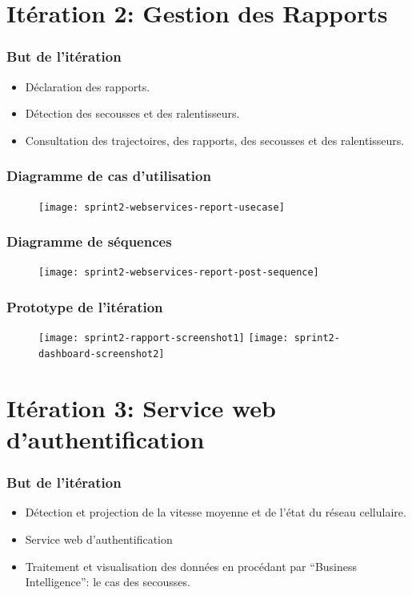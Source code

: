 \documentclass{beamer}
\begin{document}
\section{Itération 2: Gestion des Rapports}

\begin{frame}
    \frametitle{But de l'itération}
    \begin{itemize}
        \item Déclaration des rapports.
        \item Détection des secousses et des ralentisseurs.
        \item Consultation des trajectoires, des rapports, des secousses et des ralentisseurs.
    \end{itemize}
\end{frame}

\begin{frame}
    \frametitle{Diagramme de cas d'utilisation}
    \begin{figure}
        \texttt{[image: sprint2-webservices-report-usecase]}
    \end{figure}
\end{frame}

\begin{frame}
    \frametitle{Diagramme de séquences}
    \begin{figure}
        \texttt{[image: sprint2-webservices-report-post-sequence]}
    \end{figure}
\end{frame}

\begin{frame}
    \frametitle{Prototype de l'itération}
    \begin{figure}
        \texttt{[image: sprint2-rapport-screenshot1]}
        \texttt{[image: sprint2-dashboard-screenshot2]}
    \end{figure}
\end{frame}

\section{Itération 3: Service web d'authentification}

\begin{frame}
    \frametitle{But de l'itération}
    \begin{itemize}
        \item Détection et projection de la vitesse moyenne et de l'état du réseau cellulaire.
        \item Service web d'authentification
        \item Traitement et visualisation des données en procédant par ``Business Intelligence'': le cas des secousses.
    \end{itemize}
\end{frame}
\end{document}

